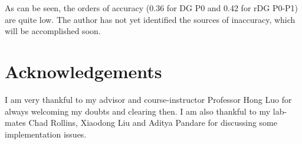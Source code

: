 \documentclass[letterpaper,twoside,12pt]{article}
\begin{document}
As can be seen, the orders of accuracy (0.36 for DG P0 and 0.42 for rDG P0-P1) are quite low. The author has not yet identified the sources of inaccuracy, which will be accomplished soon.



\section*{Acknowledgements}
I am very thankful to my advisor and course-instructor Professor Hong Luo for always welcoming my doubts and clearing then. I am also thankful to my lab-mates Chad Rollins, Xiaodong Liu and Aditya Pandare for discussing some implementation issues.
\end{document}
